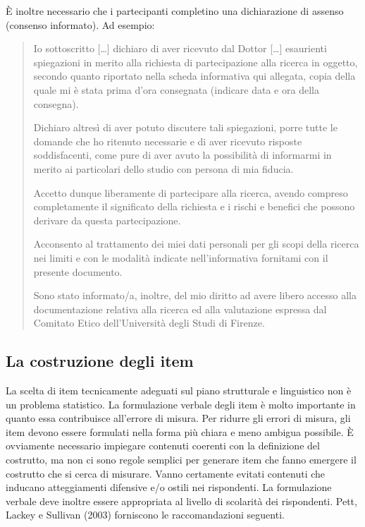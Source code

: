 È inoltre necessario che i partecipanti completino una dichiarazione di assenso (consenso informato). Ad esempio:

\begin{quote}
Io sottoscritto [\dots] dichiaro di aver ricevuto dal Dottor [\dots]
esaurienti spiegazioni in merito alla richiesta di partecipazione alla ricerca in oggetto, secondo quanto riportato nella scheda informativa qui allegata, copia della quale mi è stata prima d'ora consegnata (indicare data e ora della consegna).

Dichiaro altresì di aver potuto discutere tali spiegazioni, porre tutte le domande che ho ritenuto necessarie e di aver ricevuto risposte soddisfacenti, come pure di aver avuto la possibilità di informarmi in merito ai particolari dello studio con persona di mia fiducia.

Accetto dunque liberamente di partecipare alla ricerca, avendo compreso completamente il significato della richiesta e i rischi e benefici che possono derivare da questa partecipazione.

Acconsento al trattamento dei miei dati personali per gli scopi della ricerca nei limiti e con le modalità indicate nell'informativa fornitami con il presente documento.

Sono stato informato/a, inoltre, del mio diritto ad avere libero accesso alla documentazione relativa alla ricerca ed alla valutazione espressa dal Comitato Etico dell'Università degli Studi di Firenze.
\end{quote}

\subsection{La costruzione degli item}

La scelta di item tecnicamente adeguati sul piano strutturale e linguistico non è un problema statistico. La formulazione verbale degli item è molto importante in quanto essa contribuisce all'errore di misura. Per ridurre gli errori di misura, gli item devono essere formulati nella forma più chiara e meno ambigua possibile. È ovviamente necessario impiegare contenuti coerenti con la definizione del costrutto, ma non ci sono regole semplici per generare item che fanno emergere il costrutto che si cerca di misurare. Vanno certamente evitati contenuti che inducano atteggiamenti difensive e/o ostili nei rispondenti. La formulazione verbale deve inoltre essere appropriata al livello di scolarità dei rispondenti. Pett, Lackey e Sullivan (2003) forniscono le  raccomandazioni seguenti.

